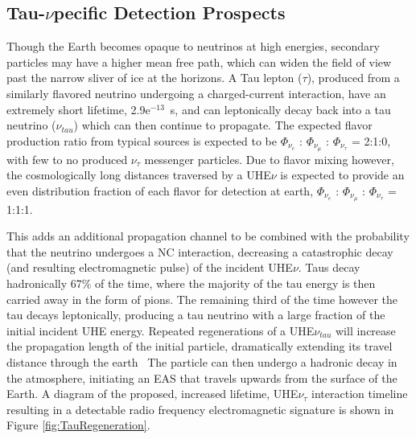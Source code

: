 		



	\subsection{Tau-\texorpdfstring{$\nu$} Specific Detection Prospects}
		Though the Earth becomes opaque to neutrinos at high energies, secondary particles may have a higher mean free path, which can widen the field of view past the narrow sliver of ice at the horizons.  A Tau lepton ($\tau$), produced from a similarly flavored neutrino undergoing a charged-current interaction, have an extremely short lifetime, 2.9e$^{-13}$~s, and can leptonically decay back into a tau neutrino ($\nu_{tau}$) which can then continue to propagate.   The expected flavor production ratio from typical sources is expected to be $\Phi_{\nu_{e}}$ : $\Phi_{\nu_{\mu}}$ : $\Phi_{\nu_{\tau}}$ = 2:1:0, with few to no produced $\nu_{\tau}$ messenger particles.  Due to flavor mixing however, the cosmologically long distances traversed by a UHE$\nu$ is expected to provide an even distribution fraction of each flavor for detection at earth, $\Phi_{\nu_{e}}$ : $\Phi_{\nu_{\mu}}$ : $\Phi_{\nu_{\tau}}$ = 1:1:1.  
		
		This adds an additional propagation channel to be combined with the probability that the neutrino undergoes a NC interaction, decreasing a catastrophic decay (and resulting electromagnetic pulse) of the incident UHE$\nu$.  Taus decay hadronically 67\% of the time, where the majority of the tau energy is then carried away in the form of pions.  The remaining third of the time however the tau decays leptonically, producing a tau neutrino with a large fraction of the initial incident UHE energy.  Repeated regenerations of a UHE$\nu_{tau}$ will increase the propagation length of the initial particle, dramatically extending its travel distance through the earth~\cite{TauRegeneration}  The particle can then undergo a hadronic decay in the atmosphere, initiating an EAS that travels upwards from the surface of the Earth.  A diagram of the proposed, increased lifetime, UHE$\nu_{\tau}$ interaction timeline resulting in a detectable radio frequency electromagnetic signature is shown in Figure \ref{fig:TauRegeneration}.
		
